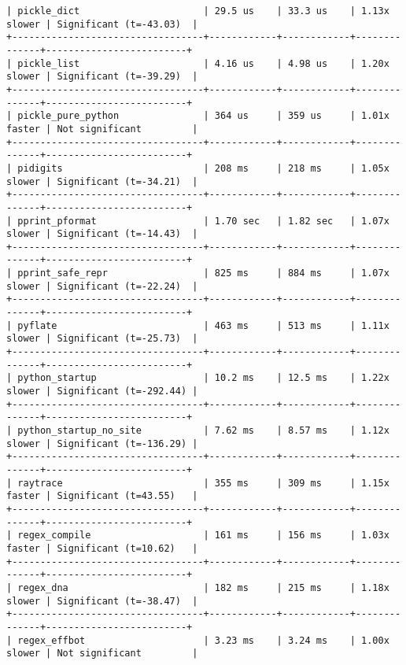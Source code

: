 \begin{code}
\begin{verbatim}
| pickle_dict                      | 29.5 us    | 33.3 us    | 1.13x slower | Significant (t=-43.03)  |
+----------------------------------+------------+------------+--------------+-------------------------+
| pickle_list                      | 4.16 us    | 4.98 us    | 1.20x slower | Significant (t=-39.29)  |
+----------------------------------+------------+------------+--------------+-------------------------+
| pickle_pure_python               | 364 us     | 359 us     | 1.01x faster | Not significant         |
+----------------------------------+------------+------------+--------------+-------------------------+
| pidigits                         | 208 ms     | 218 ms     | 1.05x slower | Significant (t=-34.21)  |
+----------------------------------+------------+------------+--------------+-------------------------+
| pprint_pformat                   | 1.70 sec   | 1.82 sec   | 1.07x slower | Significant (t=-14.43)  |
+----------------------------------+------------+------------+--------------+-------------------------+
| pprint_safe_repr                 | 825 ms     | 884 ms     | 1.07x slower | Significant (t=-22.24)  |
+----------------------------------+------------+------------+--------------+-------------------------+
| pyflate                          | 463 ms     | 513 ms     | 1.11x slower | Significant (t=-25.73)  |
+----------------------------------+------------+------------+--------------+-------------------------+
| python_startup                   | 10.2 ms    | 12.5 ms    | 1.22x slower | Significant (t=-292.44) |
+----------------------------------+------------+------------+--------------+-------------------------+
| python_startup_no_site           | 7.62 ms    | 8.57 ms    | 1.12x slower | Significant (t=-136.29) |
+----------------------------------+------------+------------+--------------+-------------------------+
| raytrace                         | 355 ms     | 309 ms     | 1.15x faster | Significant (t=43.55)   |
+----------------------------------+------------+------------+--------------+-------------------------+
| regex_compile                    | 161 ms     | 156 ms     | 1.03x faster | Significant (t=10.62)   |
+----------------------------------+------------+------------+--------------+-------------------------+
| regex_dna                        | 182 ms     | 215 ms     | 1.18x slower | Significant (t=-38.47)  |
+----------------------------------+------------+------------+--------------+-------------------------+
| regex_effbot                     | 3.23 ms    | 3.24 ms    | 1.00x slower | Not significant         |

\end{verbatim}
\end{code}
